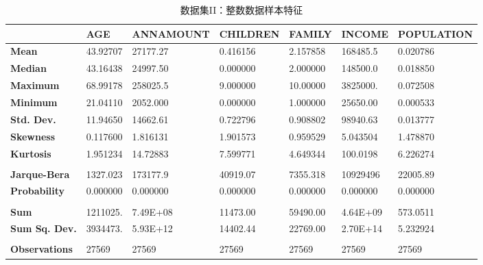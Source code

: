 \documentclass[13.5pt,hyperref,a4paper,UTF8]{ctexart}
\begin{document}
\begin{table}
    \setlength{\belowcaptionskip}{0.2cm}
    \centering
    \caption{数据集II：整数数据样本特征}
    \begin{tabular}{|l|l|l|l|l|l|l|}
    \hline
        \textbf{ } & \textbf{AGE} & \textbf{ANNAMOUNT} & \textbf{CHILDREN} & \textbf{FAMILY} & \textbf{INCOME} & \textbf{POPULATION} \\ \hline
        \textbf{ Mean} &  43.92707 &  27177.27 &  0.416156 &  2.157858 &  168485.5 &  0.020786 \\ 
        \textbf{ Median} &  43.16438 &  24997.50 &  0.000000 &  2.000000 &  148500.0 &  0.018850 \\ 
        \textbf{ Maximum} &  68.99178 &  258025.5 &  9.000000 &  10.00000 &  3825000. &  0.072508 \\ 
        \textbf{ Minimum} &  21.04110 &  2052.000 &  0.000000 &  1.000000 &  25650.00 &  0.000533 \\ 
        \textbf{ Std. Dev.} &  11.94650 &  14662.61 &  0.722796 &  0.908802 &  98940.63 &  0.013777 \\ 
        \textbf{ Skewness} &  0.117600 &  1.816131 &  1.901573 &  0.959529 &  5.043504 &  1.478870 \\ 
        \textbf{ Kurtosis} &  1.951234 &  14.72883 &  7.599771 &  4.649344 &  100.0198 &  6.226274 \\ 
        \textbf{ } &   &   &   &   &   &   \\ 
        \textbf{ Jarque-Bera} &  1327.023 &  173177.9 &  40919.07 &  7355.318 &  10929496 &  22005.89 \\ 
        \textbf{ Probability} &  0.000000 &  0.000000 &  0.000000 &  0.000000 &  0.000000 &  0.000000 \\ 
        \textbf{ } &   &   &   &   &   &   \\ 
        \textbf{ Sum} &  1211025. &  7.49E+08 &  11473.00 &  59490.00 &  4.64E+09 &  573.0511 \\ 
        \textbf{ Sum Sq. Dev.} &  3934473. &  5.93E+12 &  14402.44 &  22769.00 &  2.70E+14 &  5.232924 \\ 
        \textbf{ } &   &   &   &   &   &   \\ 
        \textbf{ Observations} &  27569 &  27569 &  27569 &  27569 &  27569 &  27569 \\ \hline
    \end{tabular}
    \label{整数数据样本描述特征}
\end{table}
\end{document}
